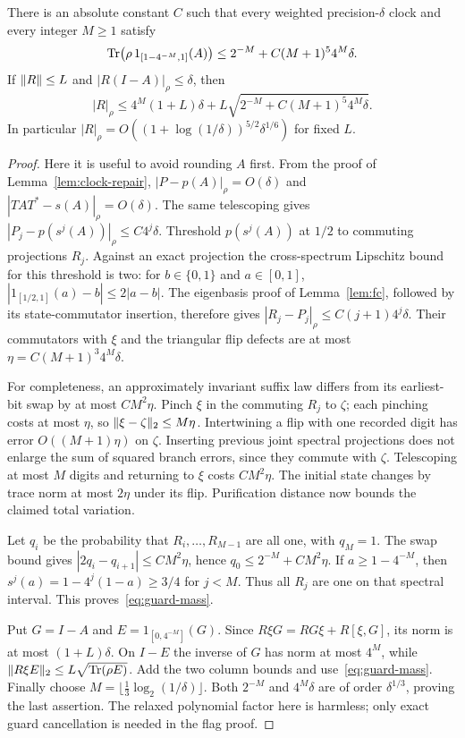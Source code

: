 \begin{proposition}\label{prop:guard-mass}
There is an absolute constant $C$ such that every weighted precision-$\delta$ clock and every integer $M\ge1$ satisfy
\begin{equation}\label{eq:guard-mass}
 \operatorname{Tr}\bigl(\rho\,1_{[1-4^{-M},1]}(A)\bigr)
 \le2^{-M}+C(M+1)^5 4^M\delta.
\end{equation}
If $\lVert R\rVert\le L$ and $|R(I-A)|_\rho\le\delta$, then
\begin{equation}\label{eq:guard-remove}
 |R|_\rho\le4^M(1+L)\delta
 +L\sqrt{2^{-M}+C(M+1)^5 4^M\delta}.
\end{equation}
In particular $|R|_\rho=O((1+\log(1/\delta))^{5/2}\delta^{1/6})$ for fixed $L$.
\end{proposition}
\begin{proof}
Here it is useful to avoid rounding $A$ first. From the proof of Lemma~\ref{lem:clock-repair}, $|P-p(A)|_\rho=O(\delta)$ and $|TAT^*-s(A)|_\rho=O(\delta)$. The same telescoping gives
$|P_j-p(s^j(A))|_\rho\le C4^j\delta$. Threshold $p(s^j(A))$ at $1/2$ to commuting projections $R_j$. Against an exact projection the cross-spectrum Lipschitz bound for this threshold is two: for $b\in\{0,1\}$ and $a\in[0,1]$, $|1_{[1/2,1]}(a)-b|\le2|a-b|$. The eigenbasis proof of Lemma~\ref{lem:fc}, followed by its state-commutator insertion, therefore gives $|R_j-P_j|_\rho\le C(j+1)4^j\delta$. Their commutators with $\xi$ and the triangular flip defects are at most $\eta=C(M+1)^3 4^M\delta$.

For completeness, an approximately invariant suffix law differs from its earliest-bit swap by at most $CM^2\eta$. Pinch $\xi$ in the commuting $R_j$ to $\zeta$; each pinching costs at most $\eta$, so $\lVert\xi-\zeta\rVert_2\le M\eta$. Intertwining a flip with one recorded digit has error $O((M+1)\eta)$ on $\zeta$. Inserting previous joint spectral projections does not enlarge the sum of squared branch errors, since they commute with $\zeta$. Telescoping at most $M$ digits and returning to $\xi$ costs $CM^2\eta$. The initial state changes by trace norm at most $2\eta$ under its flip. Purification distance now bounds the claimed total variation.

Let $q_i$ be the probability that $R_i,\ldots,R_{M-1}$ are all one, with $q_M=1$. The swap bound gives $|2q_i-q_{i+1}|\le CM^2\eta$, hence $q_0\le2^{-M}+CM^2\eta$. If $a\ge1-4^{-M}$, then $s^j(a)=1-4^j(1-a)\ge3/4$ for $j<M$. Thus all $R_j$ are one on that spectral interval. This proves~\eqref{eq:guard-mass}.

Put $G=I-A$ and $E=1_{[0,4^{-M}]}(G)$. Since $R\xi G=RG\xi+R[\xi,G]$, its norm is at most $(1+L)\delta$. On $I-E$ the inverse of $G$ has norm at most $4^M$, while $\lVert R\xi E\rVert_2\le L\sqrt{\operatorname{Tr}(\rho E)}$. Add the two column bounds and use~\eqref{eq:guard-mass}. Finally choose $M=\lfloor\frac13\log_2(1/\delta)\rfloor$. Both $2^{-M}$ and $4^M\delta$ are of order $\delta^{1/3}$, proving the last assertion. The relaxed polynomial factor here is harmless; only exact guard cancellation is needed in the flag proof.
\end{proof}
